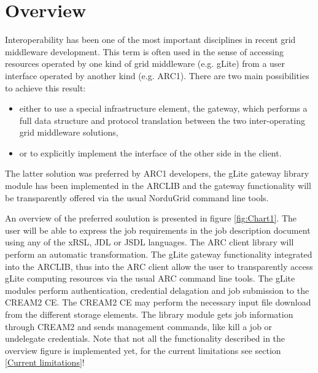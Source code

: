 \documentclass{article}
\begin{document}
\section{Overview}
\label{Overview}
Interoperability has been one of the most important disciplines in recent grid middleware development. This term is often used in the sense of accessing resources operated by one kind of grid middleware (e.g. gLite) from a user interface operated by another kind (e.g. ARC1). There are two main possibilities to achieve this result:
\begin{itemize}
\item either to use a special infrastructure element, the gateway, which performs a full data structure and protocol translation between the two inter-operating grid middleware solutions,
\item or to explicitly implement the interface of the other side in the client.
\end{itemize}
The latter solution was preferred by ARC1 developers, the gLite gateway library module has been implemented in the ARCLIB and the gateway functionality will be transparently offered via the usual NorduGrid command line tools.\par
An overview of the preferred soulution is presented in figure \ref{fig:Chart1}. The user will be able to express the job requirements in the job description document using any of the xRSL\cite{xrsl}, JDL or JSDL\cite{jsdl} languages. The ARC client library will perform an automatic transformation. The gLite gateway functionality integrated into the ARCLIB, thus into the ARC client allow the user to transparently access gLite computing resources via the usual ARC command line tools. The gLite modules perform authentication, credential delagation and job submission to the CREAM2 CE. The CREAM2 CE may perform the necessary input file download from the different storage elements. The library module gets job information through CREAM2 and sends management commands, like kill a job or undelegate credentials. Note that not all the functionality described in the overview figure is implemented yet, for the current limitations see section \ref{Current limitations}!\par
\begin{figure}[ht]
\end{figure}
\end{document}
